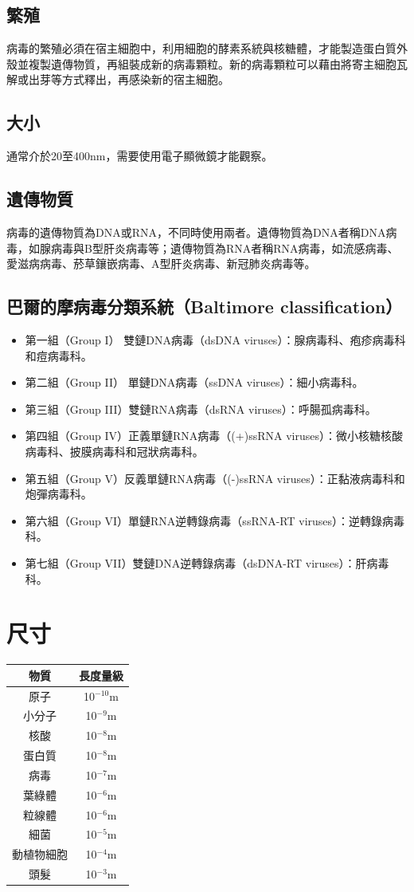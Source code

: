 \documentclass[a4paper,12pt]{report}
\begin{document}
\subsection{繁殖}
病毒的繁殖必須在宿主細胞中，利用細胞的酵素系統與核糖體，才能製造蛋白質外殼並複製遺傳物質，再組裝成新的病毒顆粒。新的病毒顆粒可以藉由將寄主細胞瓦解或出芽等方式釋出，再感染新的宿主細胞。
\subsection{大小}
通常介於20至400nm，需要使用電子顯微鏡才能觀察。
\subsection{遺傳物質}
病毒的遺傳物質為DNA或RNA，不同時使用兩者。遺傳物質為DNA者稱DNA病毒，如腺病毒與B型肝炎病毒等；遺傳物質為RNA者稱RNA病毒，如流感病毒、愛滋病病毒、菸草鑲嵌病毒、A型肝炎病毒、新冠肺炎病毒等。
\subsection{巴爾的摩病毒分類系統（Baltimore classification）}
\begin{itemize}
\item 第一組（Group I） 雙鏈DNA病毒（dsDNA viruses）：腺病毒科、疱疹病毒科和痘病毒科。
\item 第二組（Group II） 單鏈DNA病毒（ssDNA viruses）：細小病毒科。
\item 第三組（Group III）雙鏈RNA病毒（dsRNA viruses）：呼腸孤病毒科。
\item 第四組（Group IV）正義單鏈RNA病毒（(+)ssRNA viruses）：微小核糖核酸病毒科、披膜病毒科和冠狀病毒科。
\item 第五組（Group V）反義單鏈RNA病毒（(-)ssRNA viruses）：正黏液病毒科和炮彈病毒科。
\item 第六組（Group VI）單鏈RNA逆轉錄病毒（ssRNA-RT viruses）：逆轉錄病毒科。
\item 第七組（Group VII）雙鏈DNA逆轉錄病毒（dsDNA-RT viruses）：肝病毒科。
\end{itemize}
\section{尺寸}
\begin{longtable}[c]{|c|c|}
\hline
物質 & 長度量級 \\\hline
原子 & 10$^{-10}$m \\\hline
小分子 & 10$^{-9}$m \\\hline
核酸 & 10$^{-8}$m \\\hline
蛋白質 & 10$^{-8}$m \\\hline
病毒 & 10$^{-7}$m \\\hline
葉綠體 & 10$^{-6}$m \\\hline
粒線體 & 10$^{-6}$m \\\hline
細菌 & 10$^{-5}$m \\\hline
動植物細胞 & 10$^{-4}$m \\\hline
頭髮 & 10$^{-3}$m \\\hline
\end{longtable}
\end{document}
